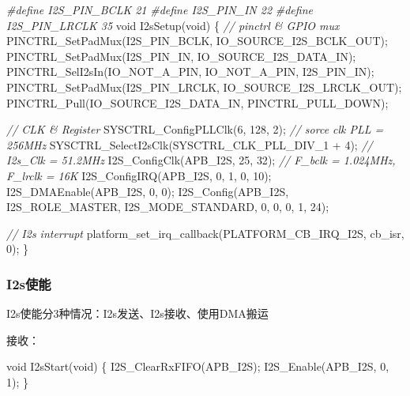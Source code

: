 \documentclass[
  12pt,
]{book}
\newenvironment{Shaded}{\begin{snugshade}}{\end{snugshade}}
\newcommand{\CommentTok}[1]{\textcolor[rgb]{0.56,0.35,0.01}{\textit{#1}}}
\newcommand{\DataTypeTok}[1]{\textcolor[rgb]{0.13,0.29,0.53}{#1}}
\newcommand{\DecValTok}[1]{\textcolor[rgb]{0.00,0.00,0.81}{#1}}
\newcommand{\NormalTok}[1]{#1}
\newcommand{\PreprocessorTok}[1]{\textcolor[rgb]{0.56,0.35,0.01}{\textit{#1}}}
\begin{document}
\begin{Shaded}
\begin{Highlighting}[]
\PreprocessorTok{#define I2S_PIN_BCLK        21}
\PreprocessorTok{#define I2S_PIN_IN          22}
\PreprocessorTok{#define I2S_PIN_LRCLK       35}
\DataTypeTok{void}\NormalTok{ I2sSetup(}\DataTypeTok{void}\NormalTok{)}
\NormalTok{\{}
    \CommentTok{// pinctrl & GPIO mux}
\NormalTok{    PINCTRL_SetPadMux(I2S_PIN_BCLK, IO_SOURCE_I2S_BCLK_OUT);}
\NormalTok{    PINCTRL_SetPadMux(I2S_PIN_IN, IO_SOURCE_I2S_DATA_IN);}
\NormalTok{    PINCTRL_SelI2sIn(IO_NOT_A_PIN, IO_NOT_A_PIN, I2S_PIN_IN);}
\NormalTok{    PINCTRL_SetPadMux(I2S_PIN_LRCLK, IO_SOURCE_I2S_LRCLK_OUT);}
\NormalTok{    PINCTRL_Pull(IO_SOURCE_I2S_DATA_IN, PINCTRL_PULL_DOWN);}
    
    \CommentTok{// CLK & Register}
\NormalTok{    SYSCTRL_ConfigPLLClk(}\DecValTok{6}\NormalTok{, }\DecValTok{128}\NormalTok{, }\DecValTok{2}\NormalTok{); }\CommentTok{// sorce clk PLL = 256MHz}
\NormalTok{    SYSCTRL_SelectI2sClk(SYSCTRL_CLK_PLL_DIV_1 + }\DecValTok{4}\NormalTok{); }\CommentTok{// I2s_Clk = 51.2MHz}
\NormalTok{    I2S_ConfigClk(APB_I2S, }\DecValTok{25}\NormalTok{, }\DecValTok{32}\NormalTok{); }\CommentTok{// F_bclk = 1.024MHz, F_lrclk = 16K}
\NormalTok{    I2S_ConfigIRQ(APB_I2S, }\DecValTok{0}\NormalTok{, }\DecValTok{1}\NormalTok{, }\DecValTok{0}\NormalTok{, }\DecValTok{10}\NormalTok{);}
\NormalTok{    I2S_DMAEnable(APB_I2S, }\DecValTok{0}\NormalTok{, }\DecValTok{0}\NormalTok{);    }
\NormalTok{    I2S_Config(APB_I2S, I2S_ROLE_MASTER, I2S_MODE_STANDARD, }\DecValTok{0}\NormalTok{, }\DecValTok{0}\NormalTok{, }\DecValTok{0}\NormalTok{, }\DecValTok{1}\NormalTok{, }\DecValTok{24}\NormalTok{);}

    \CommentTok{// I2s interrupt}
\NormalTok{    platform_set_irq_callback(PLATFORM_CB_IRQ_I2S, cb_isr, }\DecValTok{0}\NormalTok{);}
\NormalTok{\}}
\end{Highlighting}
\end{Shaded}

\hypertarget{i2sux4f7fux80fd}{%
\subsubsection{I2s使能}\label{i2sux4f7fux80fd}}

I2s使能分3种情况：I2s发送、I2s接收、使用DMA搬运

接收：

\begin{Shaded}
\begin{Highlighting}[]
\DataTypeTok{void}\NormalTok{ I2sStart(}\DataTypeTok{void}\NormalTok{)}
\NormalTok{\{}
\NormalTok{    I2S_ClearRxFIFO(APB_I2S);}
\NormalTok{    I2S_Enable(APB_I2S, }\DecValTok{0}\NormalTok{, }\DecValTok{1}\NormalTok{);}
\NormalTok{\}}
\end{Highlighting}
\end{Shaded}
\end{document}
